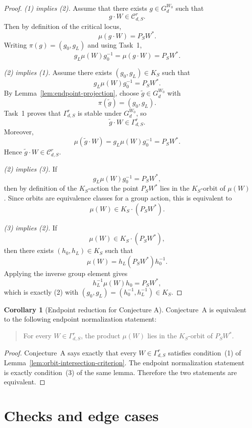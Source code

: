 \documentclass{article}
\theoremstyle{definition}
\newtheorem{corollary}[theorem]{Corollary}
\begin{document}
\begin{proof}
\textit{(1) implies (2).}
Assume that there exists $g\in G_d^{W_0}$ such that
\[
g\cdot W\in \mathcal C_{d,S}^r.
\]
Then by definition of the critical locus,
\[
\mu(g\cdot W)=P_SW^\ast.
\]
Writing $\pi(g)=(g_0,g_L)$ and using Task~1,
\[
g_L\mu(W)g_0^{-1}=\mu(g\cdot W)=P_SW^\ast.
\]

\smallskip
\textit{(2) implies (1).}
Assume there exists $(g_0,g_L)\in K_S$ such that
\[
g_L\mu(W)g_0^{-1}=P_SW^\ast.
\]
By Lemma~\ref{lem:endpoint-projection}, choose $\widetilde g\in G_d^{W_0}$ with
\[
\pi(\widetilde g)=(g_0,g_L).
\]
Task~1 proves that $\Gamma_{d,S}^r$ is stable under $G_d^{W_0}$, so
\[
\widetilde g\cdot W\in \Gamma_{d,S}^r.
\]
Moreover,
\[
\mu(\widetilde g\cdot W)=g_L\mu(W)g_0^{-1}=P_SW^\ast.
\]
Hence $\widetilde g\cdot W\in \mathcal C_{d,S}^r$.

\smallskip
\textit{(2) implies (3).}
If
\[
g_L\mu(W)g_0^{-1}=P_SW^\ast,
\]
then by definition of the $K_S$-action the point $P_SW^\ast$ lies in the $K_S$-orbit of $\mu(W)$. Since orbits are equivalence classes for a group action, this is equivalent to
\[
\mu(W)\in K_S\cdot (P_SW^\ast).
\]

\smallskip
\textit{(3) implies (2).}
If
\[
\mu(W)\in K_S\cdot (P_SW^\ast),
\]
then there exists $(h_0,h_L)\in K_S$ such that
\[
\mu(W)=h_L(P_SW^\ast)h_0^{-1}.
\]
Applying the inverse group element gives
\[
h_L^{-1}\mu(W)h_0=P_SW^\ast,
\]
which is exactly (2) with $(g_0,g_L)=(h_0^{-1},h_L^{-1})\in K_S$.
\end{proof}

\begin{corollary}[Endpoint reduction for Conjecture A]\label{cor:conjA-endpoint-reduction}
Conjecture~A is equivalent to the following endpoint normalization statement:
\begin{quote}
For every $W\in \Gamma_{d,S}^r$, the product $\mu(W)$ lies in the $K_S$-orbit of $P_SW^\ast$.
\end{quote}
\end{corollary}

\begin{proof}
Conjecture~A says exactly that every $W\in \Gamma_{d,S}^r$ satisfies condition~(1) of Lemma~\ref{lem:orbit-intersection-criterion}. The endpoint normalization statement is exactly condition~(3) of the same lemma. Therefore the two statements are equivalent.
\end{proof}

\section{Checks and edge cases}
\end{document}
